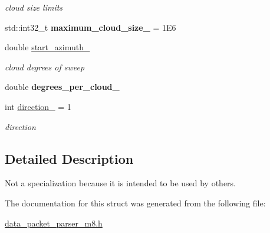 \begin{DoxyCompactItemize}
\begin{DoxyCompactList}\small\item\em cloud size limits \end{DoxyCompactList}\item 
\hypertarget{structquanergy_1_1client_1_1DataPacketParserM8_a905ad66be49de4168f9997a8bd530f84}{std\-::int32\-\_\-t {\bfseries maximum\-\_\-cloud\-\_\-size\-\_\-} = 1\-E6}\label{structquanergy_1_1client_1_1DataPacketParserM8_a905ad66be49de4168f9997a8bd530f84}

\item 
\hypertarget{structquanergy_1_1client_1_1DataPacketParserM8_a595251e17f0542f93563398c2ccad31e}{double \hyperlink{structquanergy_1_1client_1_1DataPacketParserM8_a595251e17f0542f93563398c2ccad31e}{start\-\_\-azimuth\-\_\-}}\label{structquanergy_1_1client_1_1DataPacketParserM8_a595251e17f0542f93563398c2ccad31e}

\begin{DoxyCompactList}\small\item\em cloud degrees of sweep \end{DoxyCompactList}\item 
\hypertarget{structquanergy_1_1client_1_1DataPacketParserM8_a6c7c7adf5f968c6e59a505d4aa234fdc}{double {\bfseries degrees\-\_\-per\-\_\-cloud\-\_\-}}\label{structquanergy_1_1client_1_1DataPacketParserM8_a6c7c7adf5f968c6e59a505d4aa234fdc}

\item 
\hypertarget{structquanergy_1_1client_1_1DataPacketParserM8_a5f9e9890b2f0903472d9deedfa5031d9}{int \hyperlink{structquanergy_1_1client_1_1DataPacketParserM8_a5f9e9890b2f0903472d9deedfa5031d9}{direction\-\_\-} = 1}\label{structquanergy_1_1client_1_1DataPacketParserM8_a5f9e9890b2f0903472d9deedfa5031d9}

\begin{DoxyCompactList}\small\item\em direction \end{DoxyCompactList}\end{DoxyCompactItemize}


\subsection{Detailed Description}
Not a specialization because it is intended to be used by others. 

The documentation for this struct was generated from the following file\-:\begin{DoxyCompactItemize}
\item 
\hyperlink{data__packet__parser__m8_8h}{data\-\_\-packet\-\_\-parser\-\_\-m8.\-h}\end{DoxyCompactItemize}
